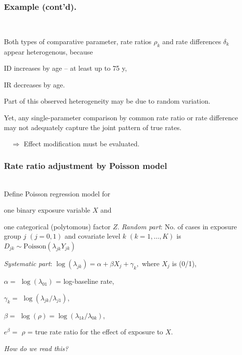 \documentclass[handout, 12pt]{beamer}
\begin{document}
\begin{frame}[fragile] \frametitle{Example (cont'd).}
\ \\ 
\bi
\item Both types of comparative parameter, rate ratios $\rho_k$ and rate differences $\delta_k$ appear heterogenous, because
\bi
\item ID increases by age -- at least up to 75 y,
\item IR decreases by age.
\ei
\item Part of this observed heterogeneity may be due to random variation. 
\item Yet, any single-parameter comparison by common rate ratio or rate difference  
may not adequately capture the
joint pattern of true rates.
\ei

$\quad \Rightarrow$ Effect modification must be evaluated.

\end{frame} 



\begin{frame}[fragile] \frametitle{Rate ratio adjustment by Poisson model}
\ \\
Define Poisson regression model for
\bi
\item one binary exposure variable $X$ and 
\item
one categorical (polytomous)  factor $Z$.
\ei
{\it Random part}: No. of cases in exposure group $j$ $(j=0,1)$
and covariate level $k$ $(k = 1, \dots, K)$ is
$ D_{jk} \sim \mbox{Poisson}(\lambda_{jk} Y_{jk})$ 

{\it Systematic part}: 
$ \log(\lambda_{jk}) = \alpha + \beta X_j +
  \gamma_k  , $
where $X_j$ is (0/1),

\bi
\item[{ }] $\alpha=$ $\log(\lambda_{01})$ = log-baseline rate, 
\item[{ }] $\gamma_k=$ $\log(\lambda_{jk}/\lambda_{j1})$,
\item[{ }] $\beta=$ $\log(\rho) = \log(\lambda_{1k}/\lambda_{0k})$,
\item[{ }] $e^{\beta}=$ $\rho$ = true rate ratio for the effect of exposure to $X$.
\ei

{\it How do we read this?}
\end{frame} 

\end{document}

